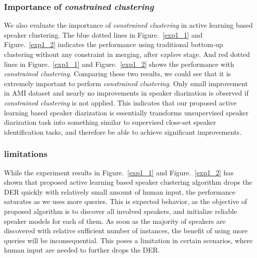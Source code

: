 \documentclass[journal,10pt]{IEEEtran}
\begin{document}
\subsubsection{Importance of \textit{constrained clustering}}
We also evaluate the importance of \textit{constrained clustering} in active learning based speaker clustering. The blue dotted lines in Figure.~\ref{exp1_1} and Figure.~\ref{exp1_2} indicates the performance using traditional bottom-up clustering without any constraint in merging, after \textit{explore} stage. And red dotted lines in Figure.~\ref{exp1_1} and Figure.~\ref{exp1_2} shows the performance with \textit{constrained clustering}. Comparing these two results, we could see that it is extremely important to perform \textit{constrained clustering}. Only small improvement in AMI dataset and nearly no improvements in speaker diarization is observed if \textit{constrained clustering} is not applied. This indicates that our proposed active learning based speaker diarization is essentially transforms unsupervised speaker diarization task into something similar to supervised close-set speaker identification tasks, and therefore be able to achieve significant improvements.


\subsubsection{limitations}
While the experiment results in Figure.~\ref{exp1_1} and Figure.~\ref{exp1_2} has shown that proposed active learning based speaker clustering algorithm drops the DER quickly with relatively small amount of human input, the performance saturates as we uses more queries. This is expected behavior, as the objective of proposed algorithm is to discover all involved speakers, and initialize reliable speaker models for each of them. As soon as the majority of speakers are discovered with relative sufficient number of instances, the benefit of using more queries will be inconsequential. This poses a limitation in certain scenarios, where human input are needed to further drops the DER.
\end{document}
